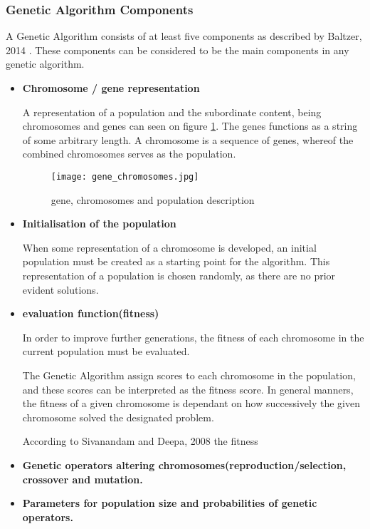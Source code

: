 \subsubsection{Genetic Algorithm Components}

A Genetic Algorithm consists of at least five components as described by Baltzer, 2014 \cite{Baltzer2014}. These components can be considered to be the main components in any genetic algorithm.
\begin{itemize}
\item \textbf{Chromosome / gene representation}

A representation of a population and the subordinate content, being chromosomes and genes can seen on figure \ref{fig:gene}.
The genes functions as a string of some arbitrary length. A chromosome is a sequence of genes, whereof the combined chromosomes serves as the population. \cite[pp. 41]{Sivanandam2008} 


\begin{figure}
\centering
\texttt{[image: gene\_chromosomes.jpg]}
\caption{gene, chromosomes and population description}
\label{fig:gene}
\end{figure}

\item \textbf{Initialisation of the population}

When some representation of a chromosome is developed, an initial population must be created as a starting point for the algorithm. This representation of a population is chosen randomly, as there are no prior evident solutions.


\item \textbf{evaluation function(fitness)}

In order to improve further generations, the fitness of each chromosome in the current population must be evaluated.

The Genetic Algorithm assign scores to each chromosome in the population, and these scores can be interpreted as the fitness score. In general manners, the fitness of a given chromosome is dependant on how successively the given chromosome solved the designated problem. \cite[pp. 8]{Melanie1990}

According to Sivanandam and Deepa, 2008 \cite{Sivanandam2008} the fitness

\item \textbf{Genetic operators altering chromosomes(reproduction/selection, crossover and mutation.}
\item \textbf{Parameters for population size and probabilities of genetic operators.}
\end{itemize}



